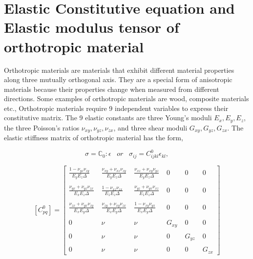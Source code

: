 \documentclass[a4paper,12pt,twoside]{report}
\begin{document}
\section{Elastic Constitutive equation and Elastic modulus tensor of orthotropic material}\label{Constitutive matrix}
\indent\indent\indent Orthotropic materials are materials that exhibit different material properties along three mutually orthogonal axis. They are a special form of anisotropic materials because their properties change when measured from different directions. Some examples of orthotropic materials are wood, composite materials etc., Orthotropic materials require 9 independent variables to express their constitutive matrix. The 9 elastic constants are three Young's moduli $E_{x},E_{y},E_{z}$, the three Poisson's ratios $\nu_{xy},\nu_{yz},\nu_{zx}$, and three shear moduli $G_{xy},G_{yz},G_{zx}$. The elastic stiffness matrix of orthotropic material has the form,

\begin{equation}
  \sigma = \mathbb{C}_{0} : \epsilon \;\;\;   or \;\;\;  \sigma_{ij}  =  C^{0}_{ijkl}\epsilon_{kl},
\end{equation}

$$
[C^{0}_{pq}] =  
 \begin{bmatrix}
  \frac{1 - \nu_{yz}\nu_{zy}}{E_{y}E_{z}\Delta} \;& \frac{\nu_{xy} + \nu_{xz}\nu_{zy}}{E_{y}E_{z}\Delta}  \;& \frac{\nu_{xz} + \nu_{xy}\nu_{yz}}{E_{y}E_{z}\Delta}  \;& 0 \;& 0 \;& 0 \\
 \\
   \frac{\nu_{yx} + \nu_{yz}\nu_{zx}}{E_{x}E_{z}\Delta}  \;&  \frac{1 - \nu_{xz}\nu_{zx}}{E_{1}E_{z}\Delta} \; & \frac{\nu_{yz} +\nu_{yx}\nu_{xz}}{E_{1}E_{z}\Delta}  \; & 0\; & 0\; & 0 \\
  \\
    \frac{\nu_{zx} + \nu_{yx}\nu_{zy}}{E_{x}E_{y}\Delta}  \;&   \frac{\nu_{zy} + \nu_{xy}\nu_{zx}}{E_{x}E_{y}\Delta} \;& \frac{1 - \nu_{xy}\nu_{yx}}{E_{x}E_{y}\Delta}  \;& 0 \;& 0 \;& 0 \\ 
\\

 
  0 \;& \nu \;& \nu \;& G_{xy} \;& 0 \;& 0 \\
  \\
  0 \;& \nu \;& \nu \;& 0 \;& G_{yz} \;& 0 \\
  \\
  0\;& \nu \;& \nu \;& 0 \;& 0 \;& G_{zx} 
 \end{bmatrix}
 $$\\
 
\end{document}
